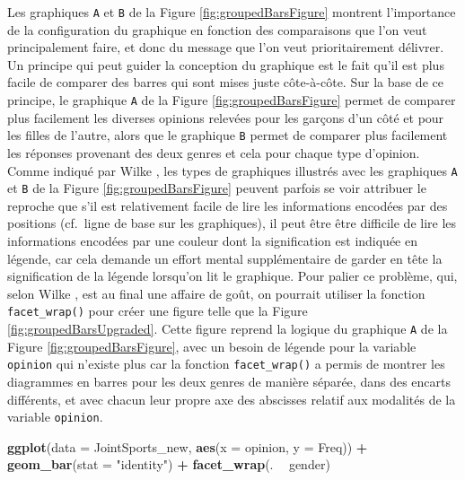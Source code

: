 \documentclass[
  french,
]{book}
\newenvironment{Shaded}{\begin{snugshade}}{\end{snugshade}}
\newcommand{\DataTypeTok}[1]{\textcolor[rgb]{0.13,0.29,0.53}{#1}}
\newcommand{\KeywordTok}[1]{\textcolor[rgb]{0.13,0.29,0.53}{\textbf{#1}}}
\newcommand{\NormalTok}[1]{#1}
\newcommand{\OperatorTok}[1]{\textcolor[rgb]{0.81,0.36,0.00}{\textbf{#1}}}
\newcommand{\StringTok}[1]{\textcolor[rgb]{0.31,0.60,0.02}{#1}}
\begin{document}
Les graphiques \texttt{A} et \texttt{B} de la Figure \ref{fig:groupedBarsFigure} montrent l'importance de la configuration du graphique en fonction des comparaisons que l'on veut principalement faire, et donc du message que l'on veut prioritairement délivrer. Un principe qui peut guider la conception du graphique est le fait qu'il est plus facile de comparer des barres qui sont mises juste côte-à-côte. Sur la base de ce principe, le graphique \texttt{A} de la Figure \ref{fig:groupedBarsFigure} permet de comparer plus facilement les diverses opinions relevées pour les garçons d'un côté et pour les filles de l'autre, alors que le graphique \texttt{B} permet de comparer plus facilement les réponses provenant des deux genres et cela pour chaque type d'opinion. Comme indiqué par Wilke \autocite*{wilkeFundamentalsDataVisualization2018}, les types de graphiques illustrés avec les graphiques \texttt{A} et \texttt{B} de la Figure \ref{fig:groupedBarsFigure} peuvent parfois se voir attribuer le reproche que s'il est relativement facile de lire les informations encodées par des positions (cf.~ligne de base sur les graphiques), il peut être être difficile de lire les informations encodées par une couleur dont la signification est indiquée en légende, car cela demande un effort mental supplémentaire de garder en tête la signification de la légende lorsqu'on lit le graphique. Pour palier ce problème, qui, selon Wilke \autocite*{wilkeFundamentalsDataVisualization2018}, est au final une affaire de goût, on pourrait utiliser la fonction \texttt{facet\_wrap()} pour créer une figure telle que la Figure \ref{fig:groupedBarsUpgraded}. Cette figure reprend la logique du graphique \texttt{A} de la Figure \ref{fig:groupedBarsFigure}, avec un besoin de légende pour la variable \texttt{opinion} qui n'existe plus car la fonction \texttt{facet\_wrap()} a permis de montrer les diagrammes en barres pour les deux genres de manière séparée, dans des encarts différents, et avec chacun leur propre axe des abscisses relatif aux modalités de la variable \texttt{opinion}.

\begin{Shaded}
\begin{Highlighting}[]
\KeywordTok{ggplot}\NormalTok{(}\DataTypeTok{data =}\NormalTok{ JointSports_new, }\KeywordTok{aes}\NormalTok{(}\DataTypeTok{x =}\NormalTok{ opinion, }\DataTypeTok{y =}\NormalTok{ Freq)) }\OperatorTok{+}
\StringTok{  }\KeywordTok{geom_bar}\NormalTok{(}\DataTypeTok{stat =} \StringTok{"identity"}\NormalTok{) }\OperatorTok{+}
\StringTok{  }\KeywordTok{facet_wrap}\NormalTok{(. }\OperatorTok{~}\StringTok{ }\NormalTok{gender)}
\end{Highlighting}
\end{Shaded}
\end{document}
